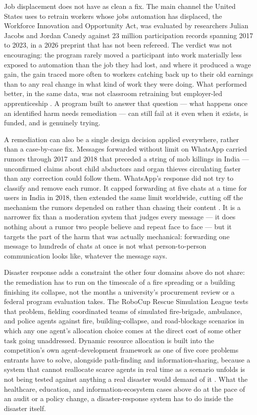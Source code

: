 Job displacement does not have as clean a fix. The main channel the United States uses to retrain workers whose jobs automation has displaced, the Workforce Innovation and Opportunity Act, was evaluated by researchers Julian Jacobs and Jordan Canedy against 23 million participation records spanning 2017 to 2023, in a 2026 preprint that has not been refereed. The verdict was not encouraging: the program rarely moved a participant into work materially less exposed to automation than the job they had lost, and where it produced a wage gain, the gain traced more often to workers catching back up to their old earnings than to any real change in what kind of work they were doing. What performed better, in the same data, was not classroom retraining but employer-led apprenticeship \autocite{jacobs2026wioa}. A program built to answer that question — what happens once an identified harm needs remediation — can still fail at it even when it exists, is funded, and is genuinely trying.

A remediation can also be a single design decision applied everywhere, rather than a case-by-case fix. Messages forwarded without limit on WhatsApp carried rumors through 2017 and 2018 that preceded a string of mob killings in India — unconfirmed claims about child abductors and organ thieves circulating faster than any correction could follow them. WhatsApp's response did not try to classify and remove each rumor. It capped forwarding at five chats at a time for users in India in 2018, then extended the same limit worldwide, cutting off the mechanism the rumors depended on rather than chasing their content \autocite{whatsapp2019forwarding}. It is a narrower fix than a moderation system that judges every message — it does nothing about a rumor two people believe and repeat face to face — but it targets the part of the harm that was actually mechanical: forwarding one message to hundreds of chats at once is not what person-to-person communication looks like, whatever the message says.

Disaster response adds a constraint the other four domains above do not share: the remediation has to run on the timescale of a fire spreading or a building finishing its collapse, not the months a university's procurement review or a federal program evaluation takes. The RoboCup Rescue Simulation League tests that problem, fielding coordinated teams of simulated fire-brigade, ambulance, and police agents against fire, building-collapse, and road-blockage scenarios in which any one agent's allocation choice comes at the direct cost of some other task going unaddressed. Dynamic resource allocation is built into the competition's own agent-development framework as one of five core problems entrants have to solve, alongside path-finding and information-sharing, because a system that cannot reallocate scarce agents in real time as a scenario unfolds is not being tested against anything a real disaster would demand of it \autocite{robocup2025rescue}. What the healthcare, education, and information-ecosystem cases above do at the pace of an audit or a policy change, a disaster-response system has to do inside the disaster itself.

